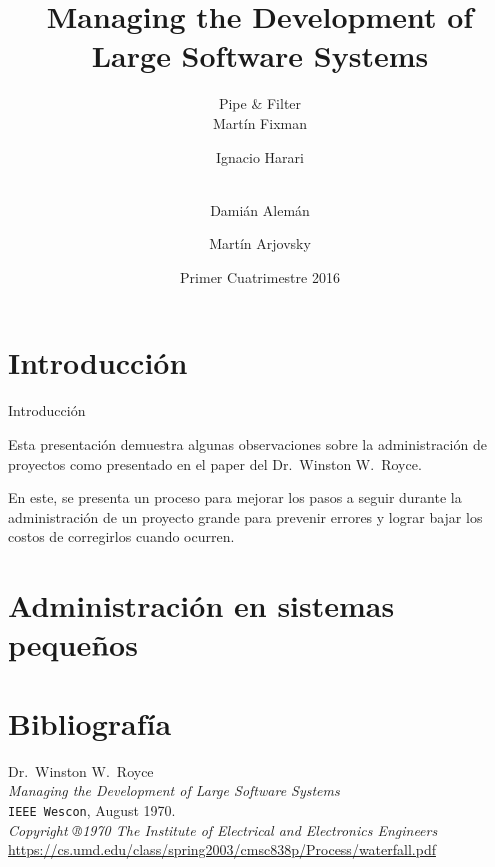 \documentclass{beamer}
\title{Managing the Development of Large Software Systems}
\author[Pipe \& Filter]{%
	{\Large Pipe \& Filter} \\ \vspace{1em}
	Martín Fixman\inst{1} \and
	Ignacio Harari\inst{1} \and \\
	Damián Alemán\inst{1} \and
	Martín Arjovsky\inst{1}
}
\institute{\inst{1} Facultad de Ciencias Exactas y Naturales}
\date{Primer Cuatrimestre 2016}
\begin{document}
\begin{frame}
\titlepage{}
\end{frame}

\section{Introducción}

\begin{frame}{Introducción}

Esta presentación demuestra algunas observaciones sobre la administración de proyectos como presentado en el paper del {\large Dr.\ Winston W.\ Royce}\cite{royce70}.

\bigskip

En este, se presenta un proceso para mejorar los pasos a seguir durante la administración de un proyecto grande para prevenir errores y lograr bajar los costos de corregirlos cuando ocurren.

\end{frame}

\section{Administración en sistemas pequeños}

\begin{frame}
\end{frame}

\section{Bibliografía}

\begin{frame}
\begin{thebibliography}{9}
  \footnotesize
  Dr.\ Winston W.\ Royce \\
  \emph{Managing the Development of Large Software Systems} \\
  \texttt{IEEE Wescon},
  August 1970. \\
  \textit{Copyright ®1970 The Institute of Electrical and Electronics Engineers} \\
  {\scriptsize\url{https://cs.umd.edu/class/spring2003/cmsc838p/Process/waterfall.pdf}}
\end{thebibliography}
\end{frame}
\end{document}

